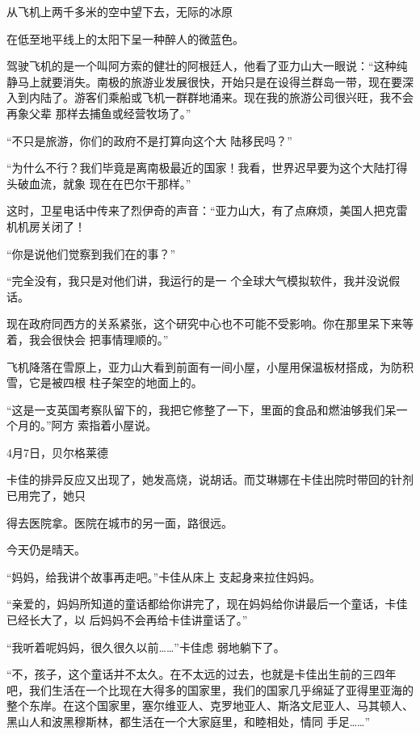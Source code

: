 \documentclass{article}
\begin{document}
从飞机上两千多米的空中望下去，无际的冰原
\newpage

在低至地平线上的太阳下呈一种醉人的微蓝色。 

驾驶飞机的是一个叫阿方索的健壮的阿根廷人，他看了亚力山大一眼说：“这种纯静马上就要消失。南极的旅游业发展很快，开始只是在设得兰群岛一带，现在要深入到内陆了。游客们乘船或飞机一群群地涌来。现在我的旅游公司很兴旺，我不会再象父辈
那样去捕鱼或经营牧场了。” 

“不只是旅游，你们的政府不是打算向这个大
陆移民吗？” 

“为什么不行？我们毕竟是离南极最近的国家！我看，世界迟早要为这个大陆打得头破血流，就象
现在在巴尔干那样。” 

这时，卫星电话中传来了烈伊奇的声音：“亚力山大，有了点麻烦，美国人把克雷机机房关闭了！


“你是说他们觉察到我们在的事？” 

\newpage

“完全没有，我只是对他们讲，我运行的是一
个全球大气模拟软件，我并没说假话。 

现在政府同西方的关系紧张，这个研究中心也不可能不受影响。你在那里呆下来等着，我会很快会
把事情理顺的。” 

飞机降落在雪原上，亚力山大看到前面有一间小屋，小屋用保温板材搭成，为防积雪，它是被四根
柱子架空的地面上的。 

“这是一支英国考察队留下的，我把它修整了一下，里面的食品和燃油够我们呆一个月的。”阿方
索指着小屋说。 



4月7日，贝尔格莱德 

卡佳的排异反应又出现了，她发高烧，说胡话。而艾琳娜在卡佳出院时带回的针剂已用完了，她只

\newpage
得去医院拿。医院在城市的另一面，路很远。 


今天仍是晴天。 

“妈妈，给我讲个故事再走吧。”卡佳从床上
支起身来拉住妈妈。 

“亲爱的，妈妈所知道的童话都给你讲完了，现在妈妈给你讲最后一个童话，卡佳已经长大了，以
后妈妈不会再给卡佳讲童话了。” 

“我听着呢妈妈，很久很久以前……”卡佳虑
弱地躺下了。 

“不，孩子，这个童话并不太久。在不太远的过去，也就是卡佳出生前的三四年吧，我们生活在一个比现在大得多的国家里，我们的国家几乎绵延了亚得里亚海的整个东岸。在这个国家里，塞尔维亚人、克罗地亚人、斯洛文尼亚人、马其顿人、黑山人和波黑穆斯林，都生活在一个大家庭里，和睦相处，情同
手足……” 

\newpage
\end{document}
